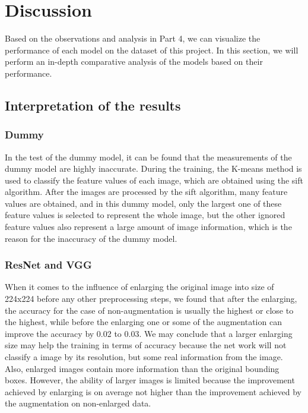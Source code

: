 \documentclass[lang=english,inputenc=utf8,fontsize=10pt]{ldvarticle}
\begin{document}
\newpage

\section{Discussion}
Based on the observations and analysis in Part 4, we can visualize the performance of each model on the dataset of this project. In this section, we will perform an in-depth comparative analysis of the models based on their performance.


\subsection{Interpretation of the results}
\subsubsection{Dummy}
In the test of the dummy model, it can be found that the measurements of the dummy model are highly inaccurate. During the training, the K-means method is used to classify the feature values of each image, which are obtained using the sift algorithm. After the images are processed by the sift algorithm, many feature values are obtained, and in this dummy model, only the largest one of these feature values is selected to represent the whole image, but the other ignored feature values also represent a large amount of image information, which is the reason for the inaccuracy of the dummy model.\\

\subsubsection{ResNet and VGG}
When it comes to the influence of enlarging the original image into size of 224x224 before any other preprocessing steps, we found that after the enlarging, the accuracy for the case of non-augmentation is usually the highest or close to the highest, while before the enlarging one or some of the augmentation can improve the accuracy by 0.02 to 0.03. We may conclude that a larger enlarging size may help the training in terms of accuracy because the net work will not classify a image by its resolution, but some real information from the image. Also, enlarged images contain more information than the original bounding boxes. However, the ability of larger images is limited because the improvement achieved by enlarging is on average not higher than the improvement achieved by the augmentation on non-enlarged data.\\
\end{document}
